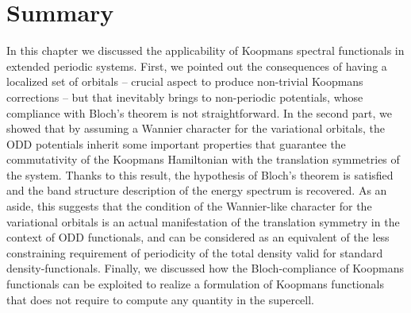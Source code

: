 \section{Summary\label{sec:ch4-summary}}
In this chapter we discussed the applicability of Koopmans spectral functionals in extended periodic systems. First, we pointed out the consequences of having a localized set of orbitals -- crucial aspect to produce non-trivial Koopmans corrections -- but that inevitably brings to non-periodic potentials, whose compliance with Bloch's theorem is not straightforward. In the second part, we showed that by assuming a Wannier character for the variational orbitals, the ODD potentials inherit some important properties that guarantee the commutativity of the Koopmans Hamiltonian with the translation symmetries of the system. Thanks to this result, the hypothesis of Bloch's theorem is satisfied and the band structure description of the energy spectrum is recovered. As an aside, this suggests that the condition of the Wannier-like character for the variational orbitals is an actual manifestation of the translation symmetry in the context of ODD functionals, and can be considered as an equivalent of the less constraining requirement of periodicity of the total density valid for standard density-functionals. Finally, we discussed how the Bloch-compliance of Koopmans functionals can be exploited to realize a formulation of Koopmans functionals that does not require to compute any quantity in the supercell.
